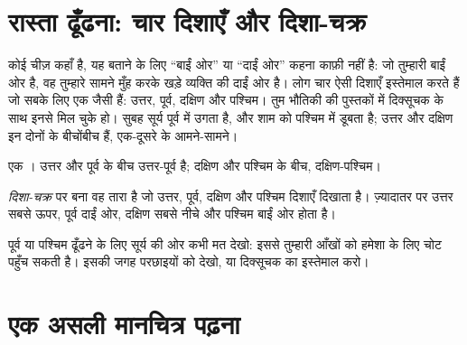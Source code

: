 \section{रास्ता ढूँढना: चार दिशाएँ और दिशा-चक्र}

कोई चीज़ कहाँ है, यह बताने के लिए ``बाईं ओर'' या ``दाईं ओर'' कहना काफ़ी
नहीं है: जो तुम्हारी बाईं ओर है, वह तुम्हारे सामने मुँह करके खड़े व्यक्ति
की दाईं ओर है। लोग चार ऐसी दिशाएँ इस्तेमाल करते हैं जो सबके लिए एक जैसी
हैं: उत्तर, पूर्व, दक्षिण और पश्चिम। तुम भौतिकी की पुस्तकों में दिक्सूचक
के साथ इनसे मिल चुके हो। सुबह सूर्य पूर्व में उगता है, और शाम को पश्चिम
में डूबता है; उत्तर और दक्षिण इन दोनों के बीचोंबीच हैं, एक-दूसरे के आमने-सामने।

\begin{omfigure}

{\small एक । उत्तर और पूर्व के बीच उत्तर-पूर्व है; दक्षिण और
पश्चिम के बीच, दक्षिण-पश्चिम।}
\label{fig:g2:drawing-to-map:rose}
\end{omfigure}

\begin{definition}[दिशा-चक्र]\label{def:g2:drawing-to-map:directions}
\emph{दिशा-चक्र}  पर बना वह तारा है जो उत्तर,
पूर्व, दक्षिण और पश्चिम दिशाएँ दिखाता है। ज़्यादातर  पर उत्तर
सबसे ऊपर, पूर्व दाईं ओर, दक्षिण सबसे नीचे और पश्चिम बाईं ओर होता है।
\end{definition}

\begin{safety}
पूर्व या पश्चिम ढूँढने के लिए सूर्य की ओर कभी मत देखो: इससे तुम्हारी आँखों
को हमेशा के लिए चोट पहुँच सकती है। इसकी जगह परछाइयों को देखो, या दिक्सूचक
का इस्तेमाल करो।
\end{safety}

\section{एक असली मानचित्र पढ़ना}

